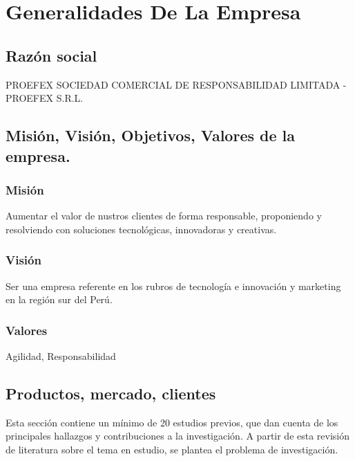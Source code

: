 \titlespacing{\chapter}{0pt}{120pt}{7pt}

\chapter{\large{Generalidades De La Empresa}}
\label{cap:generalidades}

\section{Razón social}
\label{sec:razonsocial}

PROEFEX SOCIEDAD COMERCIAL DE RESPONSABILIDAD LIMITADA - PROEFEX S.R.L.

\section{Misión, Visión, Objetivos, Valores de la empresa.}

\subsection{Misión}

Aumentar el valor de nustros clientes de forma responsable, proponiendo y resolviendo con soluciones 
tecnológicas, innovadoras y creativas.

\subsection{Visión}

Ser una empresa referente en los rubros de tecnología e innovación y marketing en la región sur del Perú.

\subsection{Valores}

Agilidad, Responsabilidad

\section{Productos, mercado, clientes}
\label{sec:antecedentes} 

Esta sección contiene un mínimo de 20 estudios previos, que dan cuenta de los principales
hallazgos y contribuciones a la investigación. A partir de esta revisión de literatura sobre
el tema en estudio, se plantea el problema de investigación.
